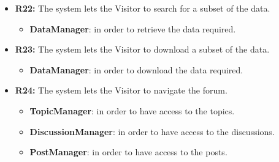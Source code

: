 \begin{itemize}
\item \textbf{R22:} The system lets the Visitor to search for a subset of the data.

\begin{itemize}
    \item \textbf{DataManager}: in order to retrieve the data required.
\end{itemize}

\item \textbf{R23:} The system lets the Visitor to download a subset of the data.

\begin{itemize}
    \item \textbf{DataManager}: in order to download the data required.
\end{itemize}

\item \textbf{R24:} The system lets the Visitor to navigate the forum.

\begin{itemize}
    \item \textbf{TopicManager}: in order to have access to the topics.
    \item \textbf{DiscussionManager}: in order to have access to the discussions.
    \item \textbf{PostManager}: in order to have access to the posts.
\end{itemize}

\end{itemize}